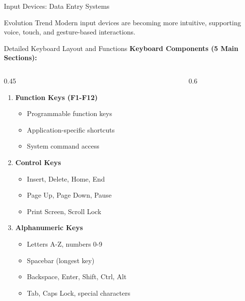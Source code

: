 \documentclass[aspectratio=169]{beamer}
\begin{document}
\begin{frame}{Input Devices: Data Entry Systems}
    \begin{alertblock}{Evolution Trend}
        Modern input devices are becoming more intuitive, supporting voice, touch, and gesture-based interactions.
    \end{alertblock}
\end{frame}

\begin{frame}{Detailed Keyboard Layout and Functions}
    \textbf{Keyboard Components (5 Main Sections):}

    \begin{columns}
        \begin{column}{0.45\textwidth}
              \begin{enumerate}
        \item[1.] \textbf{Function Keys (F1-F12)}
        \begin{itemize}
            \item Programmable function keys
            \item Application-specific shortcuts
            \item System command access
        \end{itemize}
        
        \item[2.] \textbf{Control Keys}
        \begin{itemize}
            \item Insert, Delete, Home, End
            \item Page Up, Page Down, Pause
            \item Print Screen, Scroll Lock
        \end{itemize}

\item[3.] \textbf{Alphanumeric Keys}
        \begin{itemize}
            \item Letters A-Z, numbers 0-9
            \item Spacebar (longest key)
            \item Backspace, Enter, Shift, Ctrl, Alt
            \item Tab, Caps Lock, special characters
        \end{itemize}
        \end{enumerate}

        \end{column}

        \begin{column}{0.6\textwidth}
         \begin{enumerate}
                 

\end{enumerate}
\end{column}
\end{columns}
\end{frame}
\end{document}
